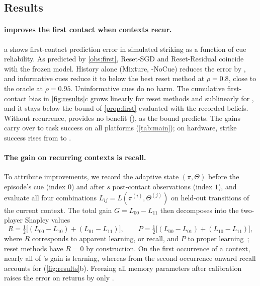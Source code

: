 

\subsection{Results}

\paragraph{\method improves the first contact when contexts recur.}
a shows first-contact prediction error in simulated striking as a function of cue reliability. As predicted by \cref{obs:first}, Reset-SGD and Reset-Residual coincide with the frozen model. History alone (Mixture, \method-NoCue) reduces the error by , and informative cues reduce it to  below the best reset method at $\rho=0.8$, close to the oracle at $\rho=0.95$. Uninformative cues do no harm. The cumulative first-contact bias in \cref{fig:results}c grows linearly for reset methods and sublinearly for \method, and it stays below the bound of \cref{prop:first} evaluated with the recorded beliefs. Without recurrence, \method provides no benefit (), as the bound predicts. The gains carry over to task success on all platforms (\cref{tab:main}); on hardware, strike success rises from  to .



\paragraph{The gain on recurring contexts is recall.}\label{sec:decomp}
To attribute improvements, we record the adaptive state $(\pi,\Theta)$ before the episode's cue (index $0$) and after $s$ post-contact observations (index $1$), and evaluate all four combinations $L_{ij}=L(\pi^{(i)},\Theta^{(j)})$ on held-out transitions of the current context. The total gain $G=L_{00}-L_{11}$ then decomposes into the two-player Shapley values
\begin{equation}\label{eq:decomp}
  R=\tfrac12\big[(L_{00}-L_{10})+(L_{01}-L_{11})\big],\qquad P=\tfrac12\big[(L_{00}-L_{01})+(L_{10}-L_{11})\big],
\end{equation}
where $R$ corresponds to apparent learning, or recall, and $P$ to proper learning~\citep{heald2021coin}; reset methods have $R=0$ by construction. On the first occurrence of a context, nearly all of \method's gain is learning, whereas from the second occurrence onward recall accounts for  (\cref{fig:results}b). Freezing all memory parameters after calibration raises the error on returns by only .


